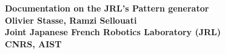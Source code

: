 \documentclass[11pt,a4paper,english,french,twoside]{book}
\begin{document}
\begin{titlepage}
\begin{center}
\vspace*{1cm}
\Huge
{}
{\bf \huge Documentation on the JRL's Pattern generator\\
}
\vspace*{0.5cm}
{\large \bf 
Olivier Stasse, Ramzi Sellouati\\
\vspace*{0.5cm}
\normalsize{
Joint Japanese French Robotics Laboratory (JRL)\\
CNRS, AIST \\
}
}
\end{center}

\end{titlepage}

\setcounter{tocdepth}{3}
\tableofcontents





\end{document}
